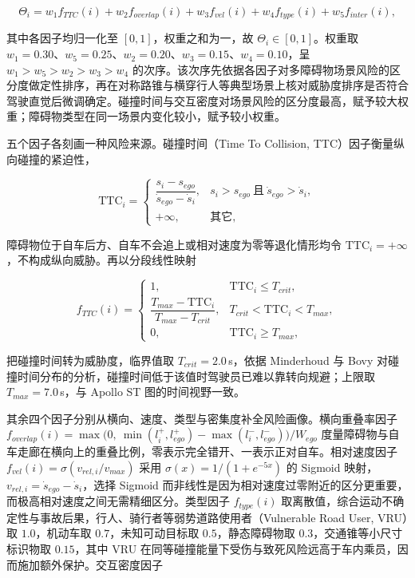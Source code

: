\documentclass[a4paper,11pt]{ctexart}
\theoremstyle{definition}
\begin{document}
\begin{equation}
    \Theta_i = w_1 f_{TTC}(i) + w_2 f_{overlap}(i) + w_3 f_{vel}(i) + w_4 f_{type}(i) + w_5 f_{inter}(i),
    \label{eq:threat_score}
\end{equation}

其中各因子均归一化至 $[0,1]$，权重之和为一，故 $\Theta_i \in [0,1]$。权重取 $w_1=0.30$、$w_5=0.25$、$w_2=0.20$、$w_3=0.15$、$w_4=0.10$，呈 $w_1>w_5>w_2>w_3>w_4$ 的次序。该次序先依据各因子对多障碍物场景风险的区分度做定性排序，再在对称路锥与横穿行人等典型场景上核对威胁度排序是否符合驾驶直觉后微调确定。碰撞时间与交互密度对场景风险的区分度最高，赋予较大权重；障碍物类型在同一场景内变化较小，赋予较小权重。

五个因子各刻画一种风险来源。碰撞时间（Time To Collision, TTC）因子衡量纵向碰撞的紧迫性，

\begin{equation}
    \mathrm{TTC}_i =
    \begin{cases}
        \dfrac{s_i - s_{ego}}{\dot{s}_{ego} - \dot{s}_i}, & s_i > s_{ego} \ \text{且}\ \dot{s}_{ego} > \dot{s}_i, \\[0.6em]
        +\infty, & \text{其它},
    \end{cases}
    \label{eq:ttc}
\end{equation}

障碍物位于自车后方、自车不会追上或相对速度为零等退化情形均令 $\mathrm{TTC}_i=+\infty$，不构成纵向威胁。再以分段线性映射

\begin{equation}
    f_{TTC}(i) =
    \begin{cases}
        1, & \mathrm{TTC}_i \leq T_{crit}, \\[0.3em]
        \dfrac{T_{max} - \mathrm{TTC}_i}{T_{max} - T_{crit}}, & T_{crit} < \mathrm{TTC}_i < T_{max}, \\[0.6em]
        0, & \mathrm{TTC}_i \geq T_{max},
    \end{cases}
    \label{eq:f_ttc}
\end{equation}

把碰撞时间转为威胁度，临界值取 $T_{crit}=2.0$\,s，依据 Minderhoud 与 Bovy 对碰撞时间分布的分析，碰撞时间低于该值时驾驶员已难以靠转向规避；上限取 $T_{max}=7.0$\,s，与 Apollo ST 图的时间视野一致。

其余四个因子分别从横向、速度、类型与密集度补全风险画像。横向重叠率因子 $f_{overlap}(i)=\max\!\big(0,\ \min(l_i^{+}, l_{ego}^{+}) - \max(l_i^{-}, l_{ego}^{-})\big)/W_{ego}$ 度量障碍物与自车走廊在横向上的重叠比例，零表示完全错开、一表示正对自车。相对速度因子 $f_{vel}(i)=\sigma(v_{rel,i}/v_{max})$ 采用 $\sigma(x)=1/(1+e^{-5x})$ 的 Sigmoid 映射，$v_{rel,i}=\dot{s}_{ego}-\dot{s}_i$，选择 Sigmoid 而非线性是因为相对速度过零附近的区分更重要，而极高相对速度之间无需精细区分。类型因子 $f_{type}(i)$ 取离散值，综合运动不确定性与事故后果，行人、骑行者等弱势道路使用者（Vulnerable Road User, VRU）取 $1.0$，机动车取 $0.7$，未知可动目标取 $0.5$，静态障碍物取 $0.3$，交通锥等小尺寸标识物取 $0.15$，其中 VRU 在同等碰撞能量下受伤与致死风险远高于车内乘员，因而施加额外保护。交互密度因子
\end{document}
